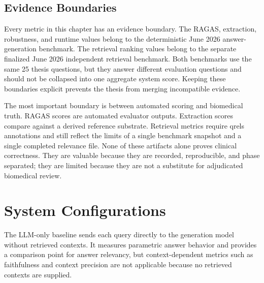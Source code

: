 \subsection{Evidence Boundaries}

Every metric in this chapter has an evidence boundary. The RAGAS, extraction, robustness, and runtime values belong to the deterministic June 2026 answer-generation benchmark. The retrieval ranking values belong to the separate finalized June 2026 independent retrieval benchmark. Both benchmarks use the same 25 thesis questions, but they answer different evaluation questions and should not be collapsed into one aggregate system score. Keeping these boundaries explicit prevents the thesis from merging incompatible evidence.

The most important boundary is between automated scoring and biomedical truth. RAGAS scores are automated evaluator outputs. Extraction scores compare against a derived reference substrate. Retrieval metrics require qrels annotations and still reflect the limits of a single benchmark snapshot and a single completed relevance file. None of these artifacts alone proves clinical correctness. They are valuable because they are recorded, reproducible, and phase separated; they are limited because they are not a substitute for adjudicated biomedical review.

\section{System Configurations}

The LLM-only baseline sends each query directly to the generation model without retrieved contexts. It measures parametric answer behavior and provides a comparison point for answer relevancy, but context-dependent metrics such as faithfulness and context precision are not applicable because no retrieved contexts are supplied.

